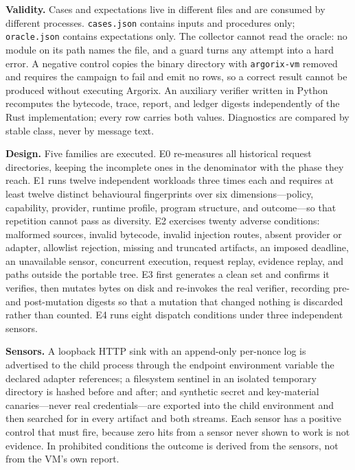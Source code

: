 \documentclass[conference]{IEEEtran}
\newcommand{\code}[1]{\nolinkurl{#1}}
\begin{document}
\textbf{Validity.}  Cases and expectations live in different files and are
consumed by different processes.  \code{cases.json} contains inputs and
procedures only; \code{oracle.json} contains expectations only.  The collector
cannot read the oracle: no module on its path names the file, and a guard turns
any attempt into a hard error.  A negative control copies the binary directory
with \code{argorix-vm} removed and requires the campaign to fail and emit no
rows, so a correct result cannot be produced without executing Argorix.  An
auxiliary verifier written in Python recomputes the bytecode, trace, report,
and ledger digests independently of the Rust implementation; every row carries
both values.  Diagnostics are compared by stable class, never by message text.

\textbf{Design.}  Five families are executed.  E0 re-measures all
\snapshotDirectories{} historical request directories, keeping the
\snapshotSourceOnly{} incomplete ones in the denominator with the phase they
reach.  E1 runs twelve independent workloads three times each and requires at
least twelve distinct behavioural fingerprints over six dimensions---policy,
capability, provider, runtime profile, program structure, and outcome---so that
repetition cannot pass as diversity.  E2 exercises twenty adverse conditions:
malformed sources, invalid bytecode, invalid injection routes, absent
provider or adapter, allowlist rejection, missing and truncated artifacts, an
imposed deadline, an unavailable sensor, concurrent execution, request replay,
evidence replay, and paths outside the portable tree.  E3 first generates a
clean set and confirms it verifies, then mutates bytes on disk and re-invokes
the real verifier, recording pre- and post-mutation digests so that a mutation
that changed nothing is discarded rather than counted.  E4 runs eight dispatch
conditions under three independent sensors.

\textbf{Sensors.}  A loopback HTTP sink with an append-only per-nonce log is
advertised to the child process through the endpoint environment variable the
declared adapter references; a filesystem sentinel in an isolated temporary
directory is hashed before and after; and synthetic secret and key-material
canaries---never real credentials---are exported into the child environment and
then searched for in every artifact and both streams.  Each sensor has a
positive control that must fire, because zero hits from a sensor never shown to
work is not evidence.  In prohibited conditions the outcome is derived from the
sensors, not from the VM's own report.
\end{document}
